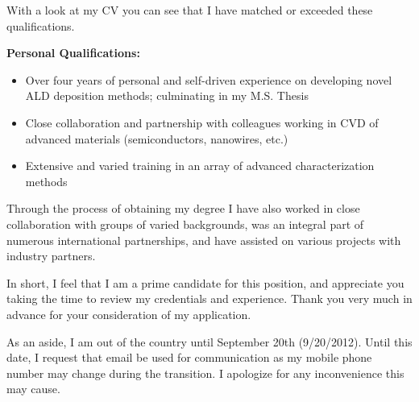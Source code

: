 \documentclass[10pt,letterpaper,sans]{moderncv}
\begin{document}
With a look at my CV you can see that I have matched or exceeded these qualifications.

\textbf{Personal Qualifications:}
\begin{itemize}
	\item Over four years of personal and self-driven experience on developing novel ALD deposition methods; culminating in my M.S. Thesis
	\item Close collaboration and partnership with colleagues working in CVD of advanced materials (semiconductors, nanowires, etc.)
	\item Extensive and varied training in an array of advanced characterization methods
\end{itemize}
\vspace{1.5em}

Through the process of obtaining my degree I have also worked in close collaboration with groups of varied backgrounds, was an integral part of numerous international partnerships, and have assisted on various projects with industry partners.

In short, I feel that I am a prime candidate for this position, and appreciate you taking the time to review my credentials and experience. Thank you very much in advance for your consideration of my application. 

As an aside, I am out of the country until September 20th (9/20/2012). Until this date, I request that email be used for communication as my mobile phone number may change during the transition. I apologize for any inconvenience this may cause.

\makeletterclosing
\end{document}
